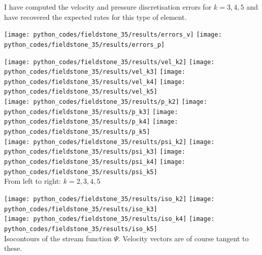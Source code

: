 I have computed the velocity and pressure discretisation errors for $k=3,4,5$ and 
have recovered the expected rates for this type of element.

\begin{center}
\texttt{[image: python\_codes/fieldstone\_35/results/errors\_v]}
\texttt{[image: python\_codes/fieldstone\_35/results/errors\_p]}
\end{center}

\newpage
\begin{center}
\texttt{[image: python\_codes/fieldstone\_35/results/vel\_k2]}
\texttt{[image: python\_codes/fieldstone\_35/results/vel\_k3]}
\texttt{[image: python\_codes/fieldstone\_35/results/vel\_k4]}
\texttt{[image: python\_codes/fieldstone\_35/results/vel\_k5]}\\
\texttt{[image: python\_codes/fieldstone\_35/results/p\_k2]}
\texttt{[image: python\_codes/fieldstone\_35/results/p\_k3]}
\texttt{[image: python\_codes/fieldstone\_35/results/p\_k4]}
\texttt{[image: python\_codes/fieldstone\_35/results/p\_k5]}\\
\texttt{[image: python\_codes/fieldstone\_35/results/psi\_k2]}
\texttt{[image: python\_codes/fieldstone\_35/results/psi\_k3]}
\texttt{[image: python\_codes/fieldstone\_35/results/psi\_k4]}
\texttt{[image: python\_codes/fieldstone\_35/results/psi\_k5]}\\
{\captionfont From left to right: $k=2,3,4,5$}
\end{center}



\begin{center}
\texttt{[image: python\_codes/fieldstone\_35/results/iso\_k2]}
\texttt{[image: python\_codes/fieldstone\_35/results/iso\_k3]}\\
\texttt{[image: python\_codes/fieldstone\_35/results/iso\_k4]}
\texttt{[image: python\_codes/fieldstone\_35/results/iso\_k5]}\\
{\captionfont Isocontours of the stream function $\Psi$. Velocity vectors
are of course tangent to these.}
\end{center}








